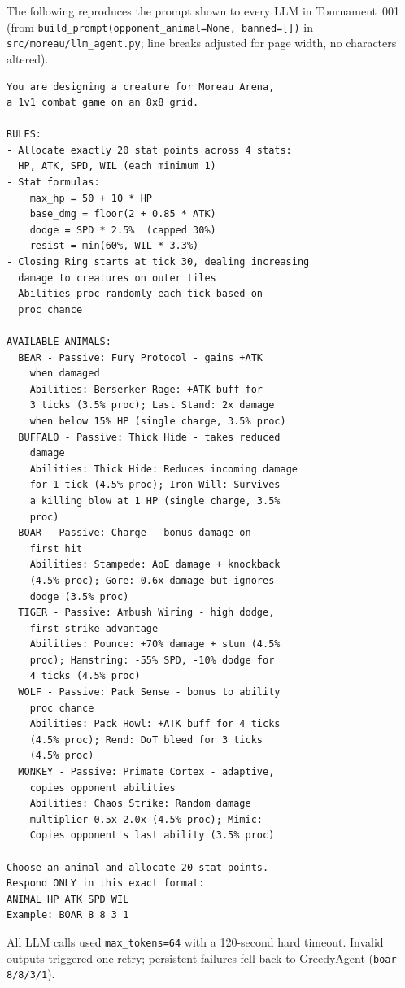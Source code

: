 \documentclass[11pt]{article}
\begin{document}
The following reproduces the prompt shown to every LLM in Tournament~001 (from \texttt{build\_prompt(opponent\_animal=None, banned=[])} in \texttt{src/moreau/llm\_agent.py}; line breaks adjusted for page width, no characters altered).

\begingroup
\small
\begin{verbatim}
You are designing a creature for Moreau Arena,
a 1v1 combat game on an 8x8 grid.

RULES:
- Allocate exactly 20 stat points across 4 stats:
  HP, ATK, SPD, WIL (each minimum 1)
- Stat formulas:
    max_hp = 50 + 10 * HP
    base_dmg = floor(2 + 0.85 * ATK)
    dodge = SPD * 2.5%  (capped 30%)
    resist = min(60%, WIL * 3.3%)
- Closing Ring starts at tick 30, dealing increasing
  damage to creatures on outer tiles
- Abilities proc randomly each tick based on
  proc chance

AVAILABLE ANIMALS:
  BEAR - Passive: Fury Protocol - gains +ATK
    when damaged
    Abilities: Berserker Rage: +ATK buff for
    3 ticks (3.5% proc); Last Stand: 2x damage
    when below 15% HP (single charge, 3.5% proc)
  BUFFALO - Passive: Thick Hide - takes reduced
    damage
    Abilities: Thick Hide: Reduces incoming damage
    for 1 tick (4.5% proc); Iron Will: Survives
    a killing blow at 1 HP (single charge, 3.5%
    proc)
  BOAR - Passive: Charge - bonus damage on
    first hit
    Abilities: Stampede: AoE damage + knockback
    (4.5% proc); Gore: 0.6x damage but ignores
    dodge (3.5% proc)
  TIGER - Passive: Ambush Wiring - high dodge,
    first-strike advantage
    Abilities: Pounce: +70% damage + stun (4.5%
    proc); Hamstring: -55% SPD, -10% dodge for
    4 ticks (4.5% proc)
  WOLF - Passive: Pack Sense - bonus to ability
    proc chance
    Abilities: Pack Howl: +ATK buff for 4 ticks
    (4.5% proc); Rend: DoT bleed for 3 ticks
    (4.5% proc)
  MONKEY - Passive: Primate Cortex - adaptive,
    copies opponent abilities
    Abilities: Chaos Strike: Random damage
    multiplier 0.5x-2.0x (4.5% proc); Mimic:
    Copies opponent's last ability (3.5% proc)

Choose an animal and allocate 20 stat points.
Respond ONLY in this exact format:
ANIMAL HP ATK SPD WIL
Example: BOAR 8 8 3 1
\end{verbatim}
\endgroup

\noindent All LLM calls used \texttt{max\_tokens=64} with a 120-second hard timeout.
Invalid outputs triggered one retry; persistent failures fell back to GreedyAgent (\texttt{boar 8/8/3/1}).
\end{document}
